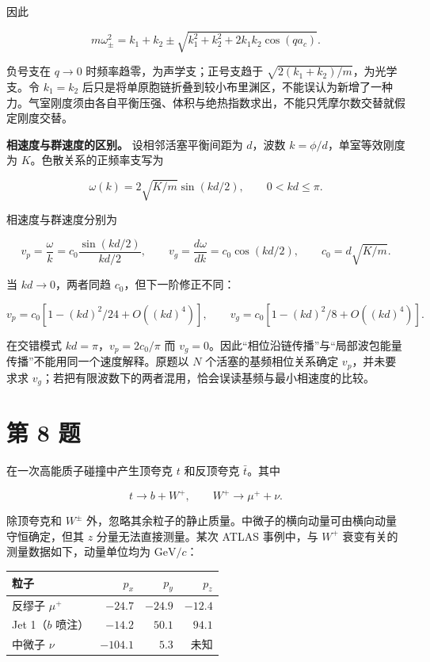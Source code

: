 \documentclass[12pt,a4paper,UTF8]{ctexart}
\begin{document}
因此

\[m\omega_\pm^2=k_1+k_2\pm\sqrt{k_1^2+k_2^2+2k_1k_2\cos(qa_c)}.\]

负号支在 \(q\to0\) 时频率趋零，为声学支；正号支趋于
\(\sqrt{2(k_1+k_2)/m}\)，为光学支。令 \(k_1=k_2\)
后只是将单原胞链折叠到较小布里渊区，不能误认为新增了一种力。气室刚度须由各自平衡压强、体积与绝热指数求出，不能只凭摩尔数交替就假定刚度交替。

\textbf{相速度与群速度的区别。} 设相邻活塞平衡间距为 \(d\)，波数
\(k=\phi/d\)，单室等效刚度为 \(K\)。色散关系的正频率支写为

\[\omega(k)=2\sqrt{K/m}\sin(kd/2),\qquad0<kd\le\pi.\]

相速度与群速度分别为

\[v_p=\frac\omega k=c_0\frac{\sin(kd/2)}{kd/2},\qquad v_g=\frac{d\omega}{dk}=c_0\cos(kd/2),\qquad c_0=d\sqrt{K/m}.\]

当 \(kd\to0\)，两者同趋 \(c_0\)，但下一阶修正不同：

\[v_p=c_0[1-(kd)^2/24+O((kd)^4)],\qquad v_g=c_0[1-(kd)^2/8+O((kd)^4)].\]

在交错模式 \(kd=\pi\)，\(v_p=2c_0/\pi\) 而
\(v_g=0\)。因此``相位沿链传播''与``局部波包能量传播''不能用同一个速度解释。原题以
\(N\) 个活塞的基频相位关系确定 \(v_p\)，并未要求求
\(v_g\)；若把有限波数下的两者混用，恰会误读基频与最小相速度的比较。

\newpage

\section{第 8 题}\label{ux7b2c-8-ux9898}

在一次高能质子碰撞中产生顶夸克 \(t\) 和反顶夸克 \(\bar t\)。其中

\[t\to b+W^+,\qquad W^+\to\mu^++\nu.\]

除顶夸克和 \(W^\pm\)
外，忽略其余粒子的静止质量。中微子的横向动量可由横向动量守恒确定，但其
\(z\) 分量无法直接测量。某次 ATLAS 事例中，与 \(W^+\)
衰变有关的测量数据如下，动量单位均为 \(\mathrm{GeV}/c\)：

\begin{center}
\begin{tabular}{lrrr}
\toprule
粒子 & $p_x$ & $p_y$ & $p_z$ \\
\midrule
反缪子 $\mu^+$ & $-24.7$ & $-24.9$ & $-12.4$ \\
Jet 1（$b$ 喷注） & $-14.2$ & $50.1$ & $94.1$ \\
中微子 $\nu$ & $-104.1$ & $5.3$ & 未知 \\
\bottomrule
\end{tabular}
\end{center}
\end{document}
